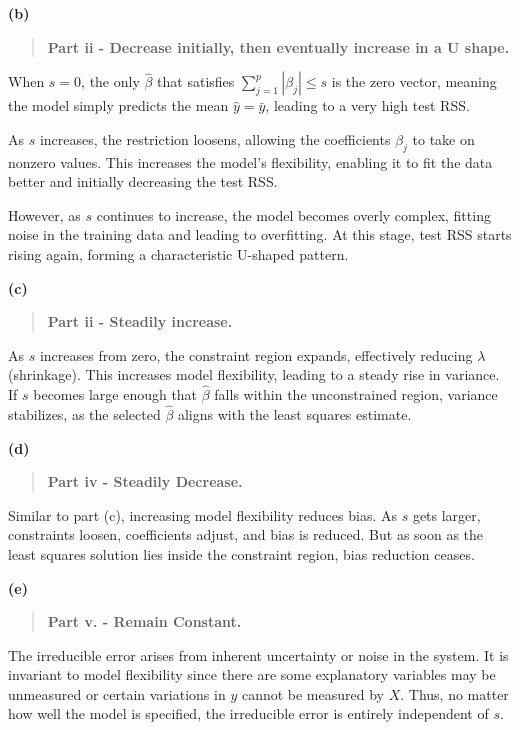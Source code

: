 \documentclass[
  letterpaper,
  DIV=11,
  numbers=noendperiod]{scrartcl}
\begin{document}
\textbf{(b)}

\begin{quote}
\textbf{Part ii - Decrease initially, then eventually increase in a U
shape.}
\end{quote}

When \(s = 0\), the only \(\hat{\beta}\) that satisfies
\(\sum_{j=1}^{p} |\beta_j| \leq s\) is the zero vector, meaning the
model simply predicts the mean \(\hat{y} = \bar{y}\), leading to a very
high test RSS.

As \(s\) increases, the restriction loosens, allowing the coefficients
\(\beta_j\) to take on nonzero values. This increases the model's
flexibility, enabling it to fit the data better and initially decreasing
the test RSS.

However, as \(s\) continues to increase, the model becomes overly
complex, fitting noise in the training data and leading to overfitting.
At this stage, test RSS starts rising again, forming a characteristic
U-shaped pattern.

\textbf{(c)}

\begin{quote}
\textbf{Part ii - Steadily increase.}
\end{quote}

As \(s\) increases from zero, the constraint region expands, effectively
reducing \(\lambda\) (shrinkage). This increases model flexibility,
leading to a steady rise in variance. If \(s\) becomes large enough that
\(\hat{\beta}\) falls within the unconstrained region, variance
stabilizes, as the selected \(\hat{\beta}\) aligns with the least
squares estimate.

\textbf{(d)}

\begin{quote}
\textbf{Part iv - Steadily Decrease.}
\end{quote}

Similar to part (c), increasing model flexibility reduces bias. As \(s\)
gets larger, constraints loosen, coefficients adjust, and bias is
reduced. But as soon as the least squares solution lies inside the
constraint region, bias reduction ceases.

\textbf{(e)}

\begin{quote}
\textbf{Part v. - Remain Constant.}
\end{quote}

The irreducible error arises from inherent uncertainty or noise in the
system. It is invariant to model flexibility since there are some
explanatory variables may be unmeasured or certain variations in \(y\)
cannot be measured by \(X\). Thus, no matter how well the model is
specified, the irreducible error is entirely independent of \(s\).
\end{document}
